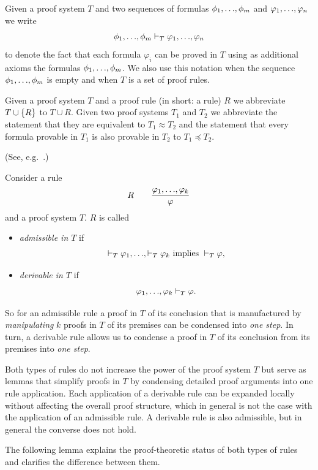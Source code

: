 \documentclass[runningheads]{llncs}       %
\begin{document}
Given a proof system $T$ and two sequences of formulas
$\phi_1, \mbox{$\ldots$}, \phi_m$ and $\varphi_1, \mbox{$\ldots$}, \varphi_n$ we write
\[
  \phi_1, \mbox{$\ldots$}, \phi_m \vdash_T \varphi_1, \mbox{$\ldots$}, \varphi_n
\]
to denote the fact that each formula $\varphi_i$ can be proved in
$T$ using as additional axioms the formulas
$\phi_1, \mbox{$\ldots$}, \phi_m$.  We also use this notation when the sequence
$\phi_1, \mbox{$\ldots$}, \phi_m$ is empty and when $T$ is a set of proof
rules.

Given a proof system $T$ and a proof rule (in short: a rule) $R$ we
abbreviate $T \cup \mbox{$\{{R}\}$}$ to $T \cup R$. Given two proof systems $T_1$
and $T_2$ we abbreviate the statement that they are equivalent to
$T_1 \approx T_2$ and the statement that every formula provable in
$T_1$ is also provable in $T_2$ to $T_1 \preceq T_2$.

\begin{definition}(See, e.g.~\cite[page 47]{Pla13}.)
  
  Consider a rule
  \[ 
  R \qquad \frac{\varphi_1,\mbox{$\ldots$},\varphi_k}{\varphi}
\]
and a proof system $T$. $R$ is called
\begin{itemize}
\item \emph{admissible in $T$} if 
\[
 \vdash_T \varphi_1, \mbox{$\ldots$}, \vdash_T \varphi_k
 \mbox{ implies }
 \vdash_T \varphi,
\]

\item \emph{derivable in $T$} if 
\[
 \varphi_1, \mbox{$\ldots$}, \varphi_k \vdash_T \varphi.
\]

\end{itemize}

\end{definition}

So for an admissible rule a proof in $T$ of its conclusion 
that is manufactured by \emph{manipulating} $k$ proofs in $T$ 
of its premises can be condensed into \emph{one step}. 
In turn, a derivable rule allows us to condense a proof in $T$ of
its conclusion from its premises into \emph{one step}.

Both types of rules do not increase the power of the proof system $T$
but serve as lemmas that simplify proofs in $T$ by condensing detailed
proof arguments into one rule application.  Each application of a
derivable rule can be expanded locally without affecting the overall
proof structure, which in general is not the case with the application
of an admissible rule.  A derivable rule is also admissible, but in
general the converse does not hold.

The following lemma explains the proof-theoretic status of both types
of rules and clarifies the difference between them.
\end{document}
